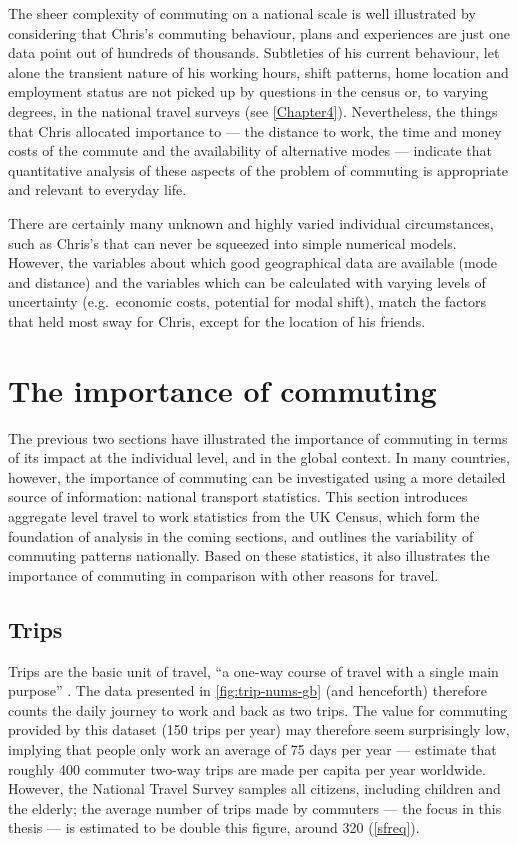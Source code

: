 \documentclass[a4paper, 11pt, twoside]{Thesis}
\begin{document}
The sheer complexity of commuting on a national scale is well illustrated
by considering that Chris's commuting behaviour, plans and experiences
are just one data point out of hundreds of thousands. Subtleties of
his current behaviour,
let alone the transient nature of his working
hours, shift patterns, home location and employment status are not
picked up by questions in the census or, to varying degrees, in the
national travel surveys (see \cref{Chapter4}). Nevertheless, the things that
Chris allocated importance to --- the distance to work, the time and money
costs of the commute and the availability of alternative modes --- indicate
that quantitative analysis of these aspects of the problem
of commuting is appropriate and relevant to everyday life.

There are certainly many unknown and highly varied individual circumstances,
such as Chris's that can never be squeezed into simple numerical models.
However, the variables about which good geographical data are available
(mode and distance) and the variables which can be calculated
with varying levels of uncertainty (e.g.~economic costs,
potential for modal shift), match the factors that held most
sway for Chris, except for the location of his friends.


\section{The importance of commuting} \label{snimportance}
The previous two sections have illustrated the importance of commuting
in terms of its impact at the individual level,
and in the global context. In many countries, however, the importance of
commuting can be investigated using a more detailed source of information:
national transport statistics. This section introduces
aggregate level travel to work statistics from the UK Census,
which form the foundation of analysis in the coming sections, and outlines
the variability of commuting patterns nationally.
Based on these statistics, it also illustrates the importance of
commuting in comparison with other reasons for travel.




\subsection{Trips}
Trips are the basic unit of travel, ``a one-way course of travel
with a single main purpose'' \citep[p.~6]{Dft2011-notes}. The data presented in
\cref{fig:trip-nums-gb} (and henceforth)
therefore counts the daily journey to work and
back as two trips. The value for commuting provided by this dataset
(150 trips per year) may therefore
seem surprisingly low, implying that people only work an average of 75 days per year
--- \citet{hall2011tourism} estimate that roughly
400 commuter two-way trips are made per capita
per year worldwide. However,
the National Travel Survey samples all citizens, including children and the
elderly; the average number of trips made by commuters --- the focus in this
thesis --- is estimated to be double this figure, around 320 (\cref{sfreq}).
\end{document}
